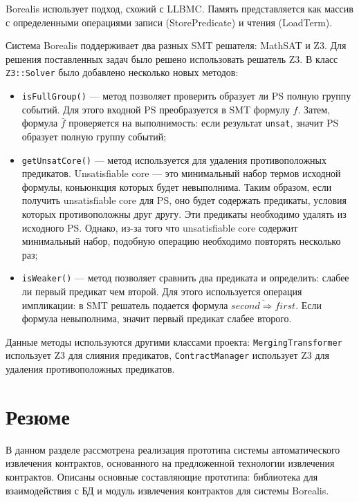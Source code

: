 Borealis использует подход, схожий с LLBMC\cite{llbmc}. Память представляется как массив с определенными операциями записи (StorePredicate) и чтения (LoadTerm)\cite{smtlib}.

Система Borealis поддерживает два разных SMT решателя: MathSAT\cite{mathsatsolver} и Z3. Для решения поставленных задач было решено использовать решатель Z3. В класс \texttt{Z3::Solver} было добавлено несколько новых методов:
\begin{itemize}
\item \texttt{isFullGroup()} --- метод позволяет проверить образует ли PS полную группу событий. Для этого входной PS преобразуется в SMT формулу $f$. Затем, формула $\bar{f}$ проверяется на выполнимость: если результат \texttt{unsat}, значит PS образует полную группу событий;
\item \texttt{getUnsatCore()} --- метод используется для удаления противоположных предикатов. Unsatisfiable core\cite{unsatcore} --- это минимальный набор термов исходной формулы, коньюнкция которых будет невыполнима. Таким образом, если получить unsatisfiable core для PS, оно будет содержать предикаты, условия которых противоположны друг другу. Эти предикаты необходимо удалять из исходного PS. Однако, из-за того что unsatisfiable core содержит минимальный набор, подобную операцию необходимо повторять несколько раз;
\item \texttt{isWeaker()} --- метод позволяет сравнить два предиката и определить: слабее ли первый предикат чем второй. Для этого используется операция импликации: в SMT решатель подается формула $\overline{second \Longrightarrow first}$. Если формула невыполнима, значит первый предикат слабее второго.
\end{itemize}

Данные методы используются другими классами проекта: \texttt{MergingTransformer} использует Z3 для слияния предикатов, \texttt{ContractManager} использует Z3 для удаления противоположных предикатов.

\section{Резюме}
В данном разделе рассмотрена реализация прототипа системы автоматического извлечения контрактов, основанного на предложенной технологии извлечения контрактов. Описаны основные составляющие прототипа: библиотека для взаимодействия с БД и модуль извлечения контрактов для системы Borealis. 